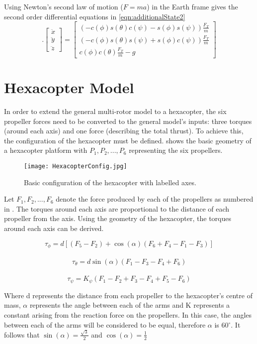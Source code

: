 Using Newton's second law of motion ($F=ma$) in the Earth frame gives the second order differential equations in \eqref{eqn:additionalState2}
\begin{equation}\label{eqn:additionalState2}.
\begin{bmatrix}
\ddot{x}\\\ddot{y}\\\ddot{z}
\end{bmatrix}
=
\begin{bmatrix}
(-c(\phi)s(\theta)c(\psi)-s(\phi)s(\psi))\frac{F_{T}}{m}\\
(-c(\phi)s(\theta)s(\psi)+s(\phi)c(\psi))\frac{F_{T}}{m}\\
c(\phi)c(\theta)\frac{F_{T}}{m}-g
\end{bmatrix}
\end{equation}

\section{Hexacopter Model}
In order to extend the general multi-rotor model to a hexacopter, the six propeller forces need to be converted to the general model's inputs: three torques (around each axis) and one force (describing the total thrust). To achieve this, the configuration of the hexacopter must be defined.  shows the basic geometry of a hexacopter platform with \(P_{1}, P_{2},...,P_{6}\) representing the six propellers. 

\begin{figure}[htb]
\begin{center}
	\texttt{[image: HexacopterConfig.jpg]}%
	\end{center}
	\caption{Basic configuration of the hexacopter with labelled axes.}%
	\label{fig:hex}%
\end{figure}


Let \(F_{1}, F_{2},...,F_{6}\) denote the force produced by each of the propellers as numbered in . The torques around each axis are proportional to the distance of each propeller from the axis. Using the geometry of the hexacopter, the torques around each axis can be derived.
\begin{flushleft}
\[\tau_{\phi}=d[(F_{5}-F_{2})+\cos(\alpha)(F_{6}+F_{4}-F_{1}-F_{3})]\]\\
\[\tau_{\theta}=d\sin(\alpha)(F_{1}-F_{3}-F_{4}+F_{6})\]\\
\[\tau_{\psi}=K_{\psi}(F_{1}-F_{2}+F_{3}-F_{4}+F_{5}-F_{6})\]
\end{flushleft}
Where d represents the distance from each propeller to the hexacopter's centre of mass, \(\alpha\) represents the angle between each of the arms and K represents a constant arising from the reaction force on the propellers. In this case, the angles between each of the arms will be considered to be equal, therefore \(\alpha\) is 60\(^{\circ}\). It follows that \(\sin(\alpha)=\frac{\sqrt{3}}{2}\) and \(\cos(\alpha)=\frac{1}{2}\)\\

